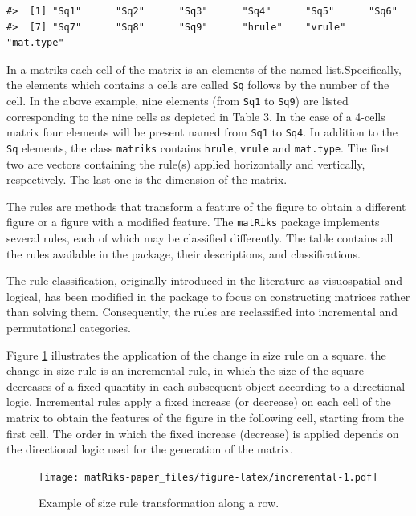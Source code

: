 \begin{verbatim}
#>  [1] "Sq1"      "Sq2"      "Sq3"      "Sq4"      "Sq5"      "Sq6"     
#>  [7] "Sq7"      "Sq8"      "Sq9"      "hrule"    "vrule"    "mat.type"
\end{verbatim}

In a matriks each cell of the matrix is an elements of the named list.Specifically, the elements which contains a cells are called \texttt{Sq} follows by the number of the cell. In the above example, nine elements (from \texttt{Sq1} to \texttt{Sq9}) are listed corresponding to the nine cells as depicted in Table 3. In the case of a 4-cells matrix four elements will be present named from \texttt{Sq1} to \texttt{Sq4}. In addition to the \texttt{Sq} elements, the class \texttt{matriks} contains \texttt{hrule}, \texttt{vrule} and \texttt{mat.type}. The first two are vectors containing the rule(s) applied horizontally and vertically, respectively. The last one is the dimension of the matrix.

The rules are methods that transform a feature of the figure to obtain a different figure or a figure with a modified feature.
The \texttt{matRiks} package implements several rules, each of which may be classified differently.
The table contains all the rules available in the package, their descriptions, and classifications.

The rule classification, originally introduced in the literature as visuospatial and logical, has been modified in the  package to focus on constructing matrices rather than solving them. Consequently, the rules are reclassified into incremental and permutational categories.

Figure \ref{fig:incremental} illustrates the application of the change in size rule on a square. the change in size rule is an incremental rule, in which the size of the square decreases of a fixed quantity in each subsequent object according to a directional logic.
Incremental rules apply a fixed increase (or decrease) on each cell of the matrix to obtain the features of the figure in the following cell, starting from the first cell.
The order in which the fixed increase (decrease) is applied depends on the directional logic used for the generation of the matrix.

\begin{figure}
\centering
\texttt{[image: matRiks-paper\_files/figure-latex/incremental-1.pdf]}
\caption{\label{fig:incremental}Example of size rule transformation along a row.}
\end{figure}

